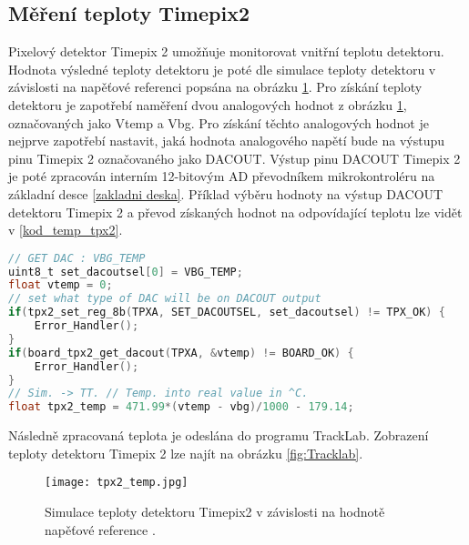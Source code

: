 \subsection{Měření teploty Timepix2}
Pixelový detektor Timepix 2 umožňuje monitorovat vnitřní teplotu detektoru. Hodnota výsledné teploty detektoru je poté dle simulace teploty detektoru v závislosti na napěťové referenci popsána na obrázku \ref{fig:tpx2_temp}. Pro získání teploty detektoru je zapotřebí naměření dvou analogových hodnot z obrázku \ref{fig:tpx2_temp}, označovaných jako Vtemp a Vbg. Pro získání těchto analogových hodnot je nejprve zapotřebí nastavit, jaká hodnota analogového napětí bude na výstupu pinu Timepix 2 označovaného jako DACOUT. Výstup pinu DACOUT Timepix 2 je poté zpracován interním 12-bitovým AD převodníkem mikrokontroléru na základní desce \ref{zakladni deska}. Příklad výběru hodnoty na výstup DACOUT detektoru Timepix 2 a převod získaných hodnot na odpovídající teplotu lze vidět v \ref{kod_temp_tpx2}.
\begin{lstlisting}[frame=single, language=C, caption={Výběr výstupu DACOUT detektoru Timepix2 a odečtení hodnoty detektoru}, label=kod_temp_tpx2]
// GET DAC : VBG_TEMP
uint8_t set_dacoutsel[0] = VBG_TEMP; 
float vtemp = 0;
// set what type of DAC will be on DACOUT output								   
if(tpx2_set_reg_8b(TPXA, SET_DACOUTSEL, set_dacoutsel) != TPX_OK) {    
	Error_Handler();
}
if(board_tpx2_get_dacout(TPXA, &vtemp) != BOARD_OK) {
	Error_Handler();
}
// Sim. -> TT. // Temp. into real value in ^C.
float tpx2_temp = 471.99*(vtemp - vbg)/1000 - 179.14;					
\end{lstlisting}
Následně zpracovaná teplota je odeslána do programu TrackLab. Zobrazení teploty detektoru Timepix 2 lze najít na obrázku \ref{fig:Tracklab}.  
\begin{figure}[h!]
	\centering
	\captionsetup{justification=centering}
	\texttt{[image: tpx2\_temp.jpg]}
	\caption{Simulace teploty detektoru Timepix2 v závislosti na hodnotě napěťové reference \cite{tpx2_manual}.} 
	\label{fig:tpx2_temp}
\end{figure}

